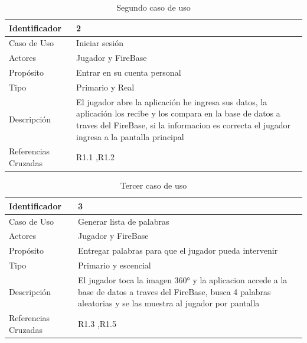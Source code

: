 \begin{table}[H]
    \begin{center}
        \begin{tabular}{| l | m{12cm} |}        
        	\hline 
        	Identificador & 2\\
        	\hline
        	Caso de Uso & Iniciar sesión\\
        	\hline
        	Actores & Jugador y FireBase\\
        	\hline
        	Propósito & Entrar en su cuenta personal\\
        	\hline
        	Tipo & Primario y Real\\
        	\hline
        	Descripción & El jugador abre la aplicación he ingresa sus datos, la aplicación los recibe y los compara en la base de datos a traves del FireBase, si la informacion es correcta el jugador ingresa a la pantalla principal \\
        	\hline
        	Referencias Cruzadas & R1.1 ,R1.2\\
        	\hline
        \end{tabular}
    \caption{Segundo caso de uso}
    \end{center}
\end{table}

\begin{table}[H]
    \begin{center}
        \begin{tabular}{| l | m{12cm} |}        
        	\hline 
        	Identificador & 3\\
        	\hline
        	Caso de Uso & Generar lista de palabras\\
        	\hline
        	Actores & Jugador y FireBase\\
        	\hline
        	Propósito & Entregar palabras para que el jugador pueda intervenir\\
        	\hline
        	Tipo & Primario y escencial\\
        	\hline
        	Descripción & El jugador toca la imagen 360° y la aplicacion accede a la base de datos a traves del FireBase, busca 4 palabras aleatorias y se las muestra al jugador por pantalla\\
        	\hline
        	Referencias Cruzadas & R1.3 ,R1.5\\
        	\hline
        \end{tabular}
    \caption{Tercer caso de uso}
    \end{center}
\end{table}

